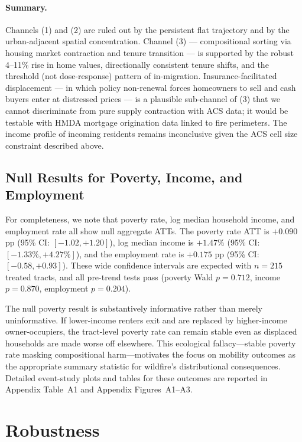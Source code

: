 \documentclass[12pt]{article}
\begin{document}
\paragraph{Summary.}
Channels (1) and (2) are ruled out by the persistent flat trajectory
and by the urban-adjacent spatial concentration.
Channel (3) --- compositional sorting via housing market contraction and
tenure transition --- is supported by the robust 4--11\% rise in home
values, directionally consistent tenure shifts, and the threshold
(not dose-response) pattern of in-migration.
Insurance-facilitated displacement --- in which policy non-renewal forces
homeowners to sell and cash buyers enter at distressed prices ---
is a plausible sub-channel of (3) that we cannot discriminate from pure
supply contraction with ACS data; it would be testable with HMDA
mortgage origination data linked to fire perimeters.
The income profile of incoming residents remains inconclusive given the
ACS cell size constraint described above.

\subsection{Null Results for Poverty, Income, and Employment}

For completeness, we note that poverty rate, log median household income,
and employment rate all show null aggregate ATTs.
The poverty rate ATT is $+0.090$ pp (95\% CI: $[-1.02, +1.20]$),
log median income is $+1.47\%$ (95\% CI: $[-1.33\%, +4.27\%]$),
and the employment rate is $+0.175$ pp (95\% CI: $[-0.58, +0.93]$).
These wide confidence intervals are expected with $n = 215$ treated tracts,
and all pre-trend tests pass (poverty Wald $p = 0.712$,
income $p = 0.870$, employment $p = 0.204$).

The null poverty result is substantively informative rather than
merely uninformative.
If lower-income renters exit and are replaced by higher-income
owner-occupiers, the tract-level poverty rate can remain stable
even as displaced households are made worse off elsewhere.
This ecological fallacy---stable poverty rate masking compositional
harm---motivates the focus on mobility outcomes as the appropriate
summary statistic for wildfire's distributional consequences.
Detailed event-study plots and tables for these outcomes are
reported in Appendix Table~A1 and Appendix Figures~A1--A3.


\section{Robustness}
\label{sec:robust}
\end{document}
